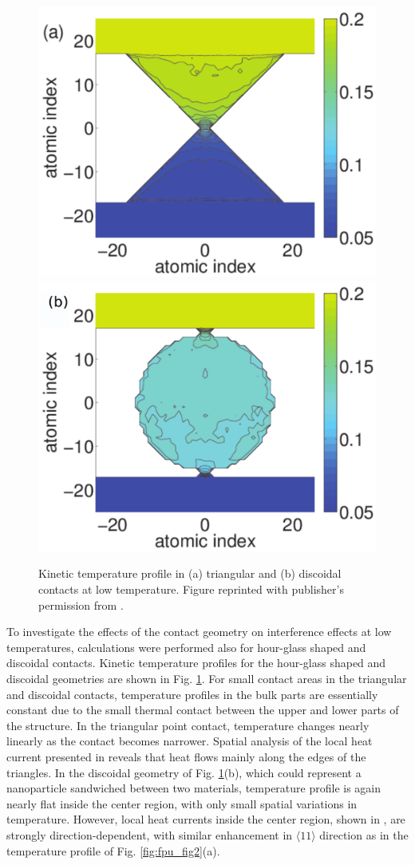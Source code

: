 \begin{figure}
\begin{center}
 \includegraphics[width=.49\columnwidth]{pics/aip_fig5a.pdf}
 \includegraphics[width=.49\columnwidth]{pics/aip_fig6a_mod.pdf}
 \caption{Kinetic temperature profile in (a) triangular and (b) discoidal contacts at low temperature. Figure reprinted with publisher's permission from .}
\label{fig:aip_figs56}
\end{center}
\end{figure}

To investigate the effects of the contact geometry on interference effects at low temperatures, calculations were performed also for hour-glass shaped and discoidal contacts.  Kinetic temperature profiles for the hour-glass shaped and discoidal geometries are shown in Fig. \ref{fig:aip_figs56}. For small contact areas in the triangular and discoidal contacts, temperature profiles in the bulk parts are essentially constant due to the small thermal contact between the upper and lower parts of the structure. In the triangular point contact, temperature changes nearly linearly as the contact becomes narrower. Spatial analysis of the local heat current presented in  reveals that heat flows mainly along the edges of the triangles. In the discoidal geometry of Fig. \ref{fig:aip_figs56}(b), which could represent a nanoparticle sandwiched between two materials, temperature profile is again nearly flat inside the center region, with only small spatial variations in temperature. However, local heat currents inside the center region, shown in , are strongly direction-dependent, with similar enhancement in $\langle 11\rangle$ direction as in the temperature profile of Fig. \ref{fig:fpu_fig2}(a).

